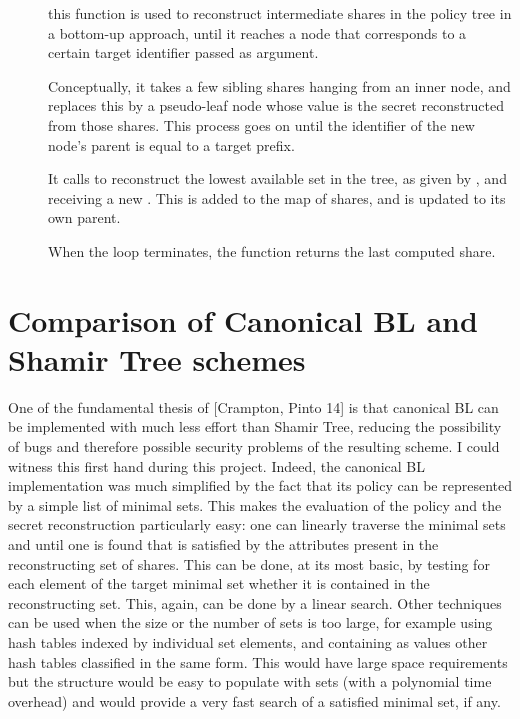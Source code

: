 \documentclass{article}
\begin{document}
\begin{description}
\item[] this function is used to reconstruct intermediate shares in the policy tree in a bottom-up approach, until it reaches a node that corresponds to a certain target identifier passed as argument.

Conceptually, it takes a few sibling shares hanging from an inner node, and replaces this by a pseudo-leaf node whose value is the secret reconstructed from those shares. This process goes on until the identifier of the new node's parent is equal to a target prefix.

It calls  to reconstruct the lowest available set in the tree, as given by , and receiving a new \cST. This is added to the map of shares, and  is updated to its own parent.

When the loop terminates, the function returns the last computed share.
\end{description}



\section{Comparison of Canonical BL and Shamir Tree schemes}

One of the fundamental thesis of [Crampton, Pinto 14] is that canonical BL can be implemented with much less effort than Shamir Tree, reducing the possibility of bugs and therefore possible security problems of the resulting scheme. I could witness this first hand during this project. Indeed, the canonical BL implementation was much simplified by the fact that its policy can be represented by a simple list of minimal sets. This makes the evaluation of the policy and the secret reconstruction particularly easy: one can linearly traverse the minimal sets and until one is found that is satisfied by the attributes present in the reconstructing set of shares. This can be done, at its most basic, by testing for each element of the target minimal set whether it is contained in the reconstructing set. This, again, can be done by a linear search. Other techniques can be used when the size or the number of sets is too large, for example using hash tables indexed by individual set elements, and containing as values other hash tables classified in the same form. This would have large space requirements but the structure would be easy to populate with sets (with a polynomial time overhead) and would provide a very fast search of a satisfied minimal set, if any.
\end{document}
